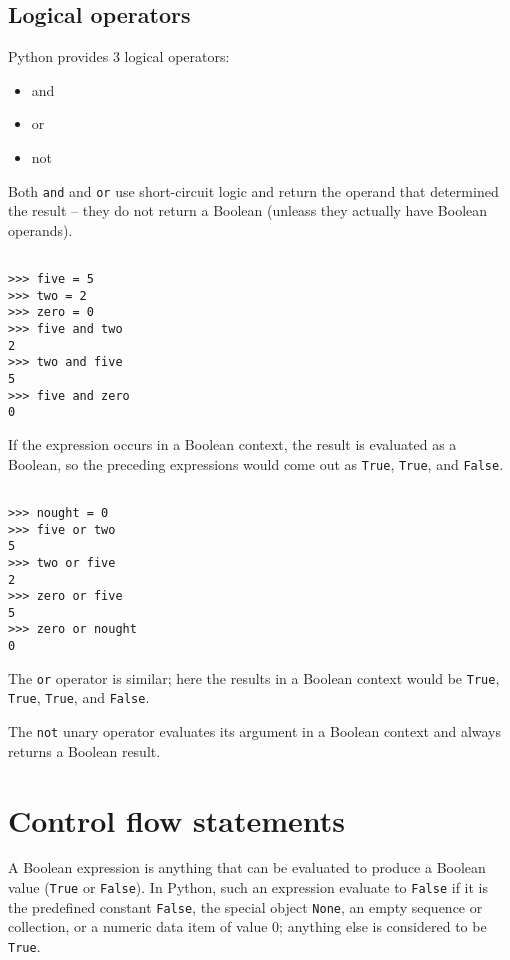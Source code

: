 \subsection{Logical operators}

Python provides 3 logical operators:
\begin{itemize}
\item and
\item or
\item not
\end{itemize}


Both \verb|and| and \verb|or| use short-circuit logic and return the operand that determined the result -- they do not return a Boolean (unleass they actually have Boolean operands).


\begin{lstlisting}

>>> five = 5
>>> two = 2
>>> zero = 0
>>> five and two
2
>>> two and five
5
>>> five and zero
0
\end{lstlisting}



If the expression occurs in a Boolean context, the result is evaluated as a Boolean, so the preceding expressions would come out as \verb|True|, \verb|True|, and \verb|False|.

\begin{lstlisting}

>>> nought = 0
>>> five or two
5
>>> two or five
2
>>> zero or five
5
>>> zero or nought
0
\end{lstlisting}



The \verb|or| operator is similar; here the results in a Boolean context would be \verb|True|, \verb|True|, \verb|True|, and \verb|False|.


The \verb|not| unary operator evaluates its argument in a Boolean context and always returns a Boolean result.


\section{Control flow statements}

A Boolean expression is anything that can be evaluated to produce a Boolean value (\verb|True| or \verb|False|).
In Python, such an expression evaluate to \verb|False| if it is the predefined constant \verb|False|, the special object \verb|None|, an empty sequence or collection, or a numeric data item of value 0; anything else is considered to be \verb|True|.


